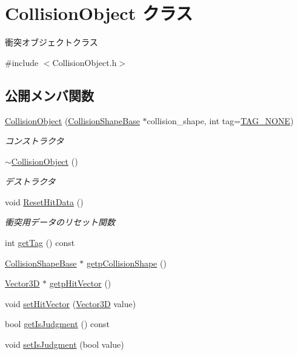 \hypertarget{class_collision_object}{}\section{Collision\+Object クラス}
\label{class_collision_object}


衝突オブジェクトクラス  




{\ttfamily \#include $<$Collision\+Object.\+h$>$}

\subsection*{公開メンバ関数}
\begin{DoxyCompactItemize}
\item 
\mbox{\hyperlink{class_collision_object_a6f502c16aaae1dc1470107a930f28808}{Collision\+Object}} (\mbox{\hyperlink{class_collision_shape_base}{Collision\+Shape\+Base}} $\ast$collision\+\_\+shape, int tag=\mbox{\hyperlink{class_collision_object_a22badef1e6fc9c2b1f002bd99ede049f}{T\+A\+G\+\_\+\+N\+O\+NE}})
\begin{DoxyCompactList}\small\item\em コンストラクタ \end{DoxyCompactList}\item 
\mbox{\hyperlink{class_collision_object_a8c4e6916bc5911b8a82498536d5a27e1}{$\sim$\+Collision\+Object}} ()
\begin{DoxyCompactList}\small\item\em デストラクタ \end{DoxyCompactList}\item 
void \mbox{\hyperlink{class_collision_object_a92dd5d21c6674605d290e0d37d64505a}{Reset\+Hit\+Data}} ()
\begin{DoxyCompactList}\small\item\em 衝突用データのリセット関数 \end{DoxyCompactList}\item 
int \mbox{\hyperlink{class_collision_object_a1198d5941d2ba8a9b394c0e43e4b9fd9}{get\+Tag}} () const
\item 
\mbox{\hyperlink{class_collision_shape_base}{Collision\+Shape\+Base}} $\ast$ \mbox{\hyperlink{class_collision_object_a2885ef749588dced5af2bd171e2f2a6e}{getp\+Collision\+Shape}} ()
\item 
\mbox{\hyperlink{class_vector3_d}{Vector3D}} $\ast$ \mbox{\hyperlink{class_collision_object_a4a0e83479d6e4c15b8f81cafe56c618a}{getp\+Hit\+Vector}} ()
\item 
void \mbox{\hyperlink{class_collision_object_a1087fa9cebfe0b1675923807b73d8868}{set\+Hit\+Vector}} (\mbox{\hyperlink{class_vector3_d}{Vector3D}} value)
\item 
bool \mbox{\hyperlink{class_collision_object_ac11b01882a159efadbe62bd5a66c49aa}{get\+Is\+Judgment}} () const
\item 
void \mbox{\hyperlink{class_collision_object_a3000144caea71e39cbdafebb249fef7e}{set\+Is\+Judgment}} (bool value)
\end{DoxyCompactItemize}
